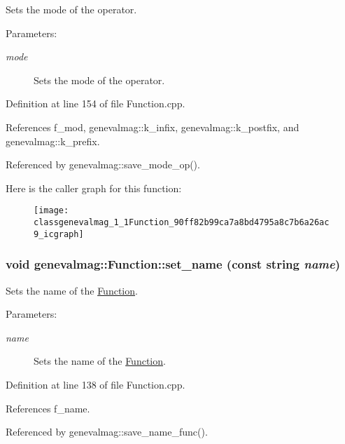 Sets the mode of the operator. \begin{Desc}
\item[Parameters:]
\begin{description}
\item[{\em mode}]Sets the mode of the operator. \end{description}
\end{Desc}


Definition at line 154 of file Function.cpp.

References f\_\-mod, genevalmag::k\_\-infix, genevalmag::k\_\-postfix, and genevalmag::k\_\-prefix.

Referenced by genevalmag::save\_\-mode\_\-op().

Here is the caller graph for this function:\nopagebreak
\begin{figure}[H]
\begin{center}
\leavevmode
\texttt{[image: classgenevalmag\_1\_1Function\_90ff82b99ca7a8bd4795a8c7b6a26ac9\_icgraph]}
\end{center}
\end{figure}
\hypertarget{classgenevalmag_1_1Function_09a0403fa5eac256e223802d6328041e}{
\subsubsection[{set\_\-name}]{\setlength{\rightskip}{0pt plus 5cm}void genevalmag::Function::set\_\-name (const string {\em name})}}
\label{classgenevalmag_1_1Function_09a0403fa5eac256e223802d6328041e}


Sets the name of the \hyperlink{classgenevalmag_1_1Function}{Function}. \begin{Desc}
\item[Parameters:]
\begin{description}
\item[{\em name}]Sets the name of the \hyperlink{classgenevalmag_1_1Function}{Function}. \end{description}
\end{Desc}


Definition at line 138 of file Function.cpp.

References f\_\-name.

Referenced by genevalmag::save\_\-name\_\-func().

